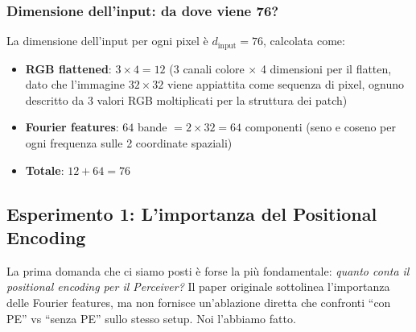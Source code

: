 \documentclass[12pt,a4paper]{article}
\begin{document}
\subsubsection{Dimensione dell'input: da dove viene 76?}

La dimensione dell'input per ogni pixel \`e $d_{\text{input}} = 76$, calcolata come:
\begin{itemize}
    \item \textbf{RGB flattened}: $3 \times 4 = 12$ (3 canali colore $\times$ 4 dimensioni per il flatten, dato che l'immagine $32 \times 32$ viene appiattita come sequenza di pixel, ognuno descritto da 3 valori RGB moltiplicati per la struttura dei patch)
    \item \textbf{Fourier features}: $64$ bande $= 2 \times 32 = 64$ componenti (seno e coseno per ogni frequenza sulle 2 coordinate spaziali)
    \item \textbf{Totale}: $12 + 64 = 76$
\end{itemize}

\begin{center}
\end{center}


\subsection{Esperimento 1: L'importanza del Positional Encoding} \label{sec:exp_pe_importance}

La prima domanda che ci siamo posti \`e forse la pi\`u fondamentale: \textit{quanto conta il positional encoding per il Perceiver?} Il paper originale sottolinea l'importanza delle Fourier features, ma non fornisce un'ablazione diretta che confronti ``con PE'' vs ``senza PE'' sullo stesso setup. Noi l'abbiamo fatto.
\end{document}
